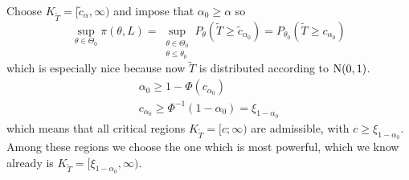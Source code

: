 \documentclass[12pt]{extarticle}
\newcommand{\Normal}{{\operatorfont N}}
\begin{document}
Choose $K_{\tilde T} = [ \tilde c_\alpha, \infty )$ and impose that $\alpha_0 \geq \alpha$ so
\begin{equation}
    \sup_{\theta \in \Theta_0} \pi(\theta, L) = \sup_{\substack{\theta \in \Theta_0 \\ \theta \leq \theta_0}} P_\theta (\tilde T \geq \tilde c_{\alpha_0}) = P_{\theta_0}(\tilde T \geq c_{\alpha_0})
\end{equation}
which is especially nice because now $\tilde T$ is distributed according to $\Normal(0,1)$.
\begin{gather}
    \alpha_0 \geq 1- \Phi(c_{\alpha_0}) \\
    c_{\alpha_0} \geq \Phi^{-1}(1- \alpha_0) = \xi_{1-\alpha_0}
\end{gather}
which means that all critical regions $K_{\tilde T} = [c; \infty)$ are admissible, with $c \geq \xi_{1 - \alpha_0}$.
Among these regions we choose the one which is most powerful, which we know already is $K_{\tilde T} = [\xi_{1-\alpha_0}, \infty)$.
\end{document}
